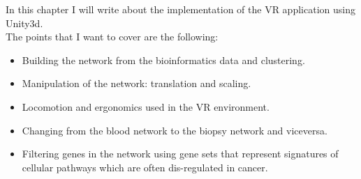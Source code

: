 In this chapter I will write about the implementation of the VR application using Unity3d.\\
The points that I want to cover are the following:
\begin{itemize}
  \item Building the network from the bioinformatics data and clustering.
  \item Manipulation of the network: translation and scaling.
  \item Locomotion and ergonomics used in the VR environment.
  \item Changing from the blood network to the biopsy network and viceversa.
  \item Filtering genes in the network using gene sets that represent signatures of cellular pathways which are often dis-regulated in cancer.
\end{itemize}
